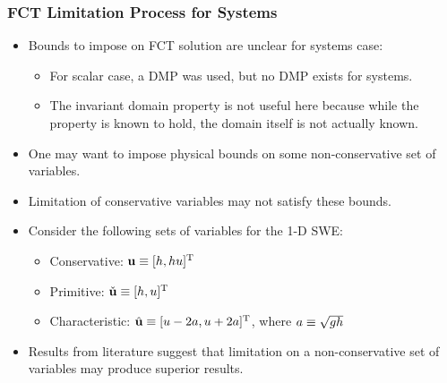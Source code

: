 \documentclass{beamer} \useoutertheme{infolines}
\begin{document}
\begin{frame}
\frametitle{FCT Limitation Process for Systems}

\begin{itemize}
  \item Bounds to impose on FCT solution are unclear for systems case:
    \begin{itemize}
      \item For scalar case, a DMP was used, but no DMP exists for systems.
      \item The invariant domain property is not useful here
        because while the property is known to hold, the domain itself is not
        actually known.
    \end{itemize}
  \item One may want to impose physical bounds on some non-conservative
    set of variables.
  \item Limitation of conservative variables may not satisfy these bounds.
  \item Consider the following sets of variables for the 1-D SWE:
    \begin{itemize}
      \item \textcolor{secondarycolorheavy}{Conservative}:
        $\mathbf{u} \equiv [h,hu]^{\text{T}}$
      \item \textcolor{secondarycolorheavy}{Primitive}:
        $\check{\mathbf{u}} \equiv [h,u]^{\text{T}}$
      \item \textcolor{secondarycolorheavy}{Characteristic}:
        $\hat{\mathbf{u}} \equiv [u-2a,
          u+2a]^{\text{T}}$,
          where $a\equiv\sqrt{gh}$
    \end{itemize}
  \item Results from literature suggest that limitation on a non-conservative
    set of variables may produce superior results.
\end{itemize}

\end{frame}
\end{document}
